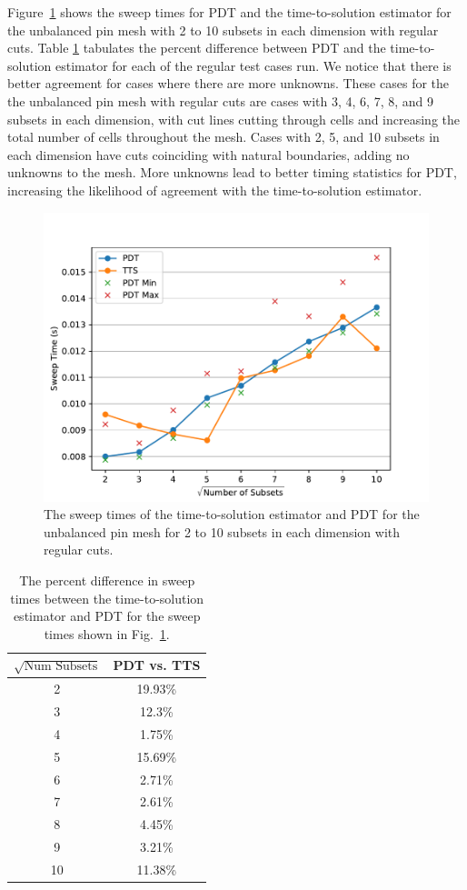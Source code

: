 \documentclass[times,final]{elsarticle}
\begin{document}
Figure~\ref{comp_reg_spiderweb} shows the sweep times for PDT and the time-to-solution estimator for the unbalanced pin mesh with 2 to 10 subsets in each dimension with regular cuts.
Table \ref{diff_reg_spiderweb} tabulates the percent difference between PDT and the time-to-solution estimator for each of the regular test cases run.
We notice that there is better agreement for cases where there are more unknowns.
These cases for the the unbalanced pin mesh with regular cuts are cases with 3, 4, 6, 7, 8, and 9 subsets in each dimension, with cut lines cutting through cells and increasing the total number of cells throughout the mesh.
Cases with 2, 5, and 10 subsets in each dimension have cuts coinciding with natural boundaries, adding no unknowns to the mesh.
More unknowns lead to better timing statistics for PDT, increasing the likelihood of agreement with the time-to-solution estimator.
\begin{figure}[!ht]
\centering
\includegraphics[scale=0.75]{../figures/spiderweb_reg_pdtvtts.pdf}
\caption{The sweep times of the time-to-solution estimator and PDT for the unbalanced pin mesh for 2 to 10 subsets in each dimension with regular cuts.}
\label{comp_reg_spiderweb}
\end{figure}
\begin{table}[!ht]
\centering
\caption{The percent difference in sweep times between the time-to-solution estimator and PDT for the sweep times shown in Fig.~\ref{comp_reg_spiderweb}.}
\label{diff_reg_spiderweb}
\begin{tabular}{c|c}
\textbf{$\sqrt{\text{Num Subsets}}$} & \bf PDT vs. TTS \\ \hline
2&19.93\%\\ \hline
3&12.3\%\\ \hline
4&1.75\%\\ \hline
5&15.69\%\\ \hline
6&2.71\%\\ \hline
7&2.61\%\\ \hline
8&4.45\%\\ \hline
9&3.21\%\\ \hline
10&11.38\%
\end{tabular}
\end{table}
\end{document}
